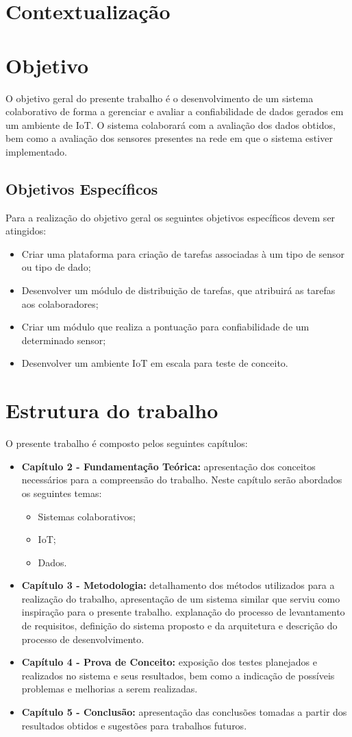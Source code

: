 \section{Contextualização}
\section{Objetivo}
O objetivo geral do presente trabalho é o desenvolvimento de um sistema colaborativo de forma a gerenciar e avaliar a confiabilidade de dados
gerados em um ambiente de \acrlong{IoT}. O sistema colaborará com a avaliação dos dados obtidos, bem como a avaliação
dos sensores presentes na rede em que o sistema estiver implementado.
\subsection{Objetivos Específicos}
Para a realização do objetivo geral os seguintes objetivos específicos devem ser atingidos:
\begin{itemize}
  \item Criar uma plataforma para criação de tarefas associadas à um tipo de sensor ou tipo de dado;
  \item Desenvolver um módulo de distribuição de tarefas, que atribuirá as tarefas aos colaboradores;
  \item Criar um módulo que realiza a pontuação para confiabilidade de um determinado sensor;
  \item Desenvolver um ambiente \acrshort{IoT} em escala para teste de conceito.
\end{itemize}
\section{Estrutura do trabalho}
O presente trabalho é composto pelos seguintes capítulos:
\begin{itemize}
  \item \textbf{Capítulo 2 - Fundamentação Teórica:} apresentação dos conceitos necessários para a compreensão do
  trabalho. Neste capítulo serão abordados os seguintes temas:
  \begin{itemize}
    \item Sistemas colaborativos;
    \item \acrlong{IoT};
    \item Dados.
  \end{itemize}
  \item \textbf{Capítulo 3 - Metodologia:} detalhamento dos métodos utilizados para a realização do trabalho,
  apresentação de um sistema similar que serviu como inspiração para o presente trabalho.
  explanação do processo de levantamento de requisitos, definição do sistema proposto e da arquitetura
  e descrição do processo de desenvolvimento.
  \item \textbf{Capítulo 4 - Prova de Conceito:} exposição dos testes planejados e realizados no sistema e seus resultados, bem como a indicação de possíveis problemas e melhorias a serem realizadas.
  \item \textbf{Capítulo 5 - Conclusão:} apresentação das conclusões tomadas a partir dos resultados obtidos e
  sugestões para trabalhos futuros.
\end{itemize}
